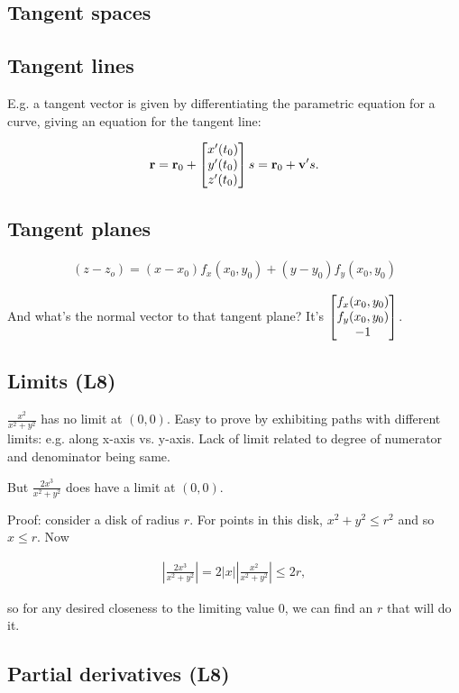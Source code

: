 \subsection{Tangent spaces}

\subsection*{Tangent lines}
E.g. a tangent vector is given by differentiating the parametric equation for a
curve, giving an equation for the tangent line:

\begin{align*}
  \mathbf r = \mathbf r_0 + \begin{bmatrix}x'(t_0)\\y'(t_0)\\z'(t_0)\end{bmatrix}s = \mathbf r_0 + \mathbf v' s.
\end{align*}

\subsection*{Tangent planes}

\begin{align*}
  (z - z_o) = (x - x_0)f_x(x_0, y_0) + (y - y_0)f_y(x_0, y_0)
\end{align*}

And what's the normal vector to that tangent plane? It's
$\begin{bmatrix}f_x(x_0, y_0)\\f_y(x_0, y_0)\\-1\end{bmatrix}$.


\subsection{Limits (L8)}

$\frac{x^2}{x^2 + y^2}$ has no limit at $(0, 0)$.
Easy to prove by exhibiting paths with different limits: e.g. along x-axis vs. y-axis.
Lack of limit related to degree of numerator and denominator being same.

But $\frac{2x^3}{x^2 + y^2}$ does have a limit at $(0, 0)$.

Proof: consider a disk of radius $r$. For points in this disk, $x^2 + y^2 \leq r^2$ and so $x \leq r$.
Now

\begin{align*}
  \left|\frac{2x^3}{x^2 + y^2}\right| = 2|x|\left|\frac{x^2}{x^2 + y^2}\right| \leq 2r,
\end{align*}

so for any desired closeness to the limiting value 0, we can find an $r$ that will do it.

\subsection{Partial derivatives (L8)}

